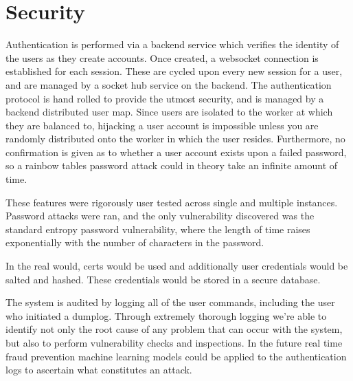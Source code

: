 \chapter{Security}
Authentication is performed via a backend service which verifies the identity of the users as they create accounts.
Once created, a websocket connection is established for each session.
These are cycled upon every new session for a user, and are managed by a socket hub service on the backend.
The authentication protocol is hand rolled to provide the utmost security, and is managed by a backend distributed user map.
Since users are isolated to the worker at which they are balanced to, hijacking a user account is impossible unless you are randomly distributed onto the worker in which the user resides.
Furthermore, no confirmation is given as to whether a user account exists upon a failed password, so a rainbow tables password attack could in theory take an infinite amount of time.

These features were rigorously user tested across single and multiple instances.
Password attacks were ran, and the only vulnerability discovered was the standard entropy password vulnerability, where the length of time raises exponentially with the number of characters in the password.

In the real would, certs would be used and additionally user credentials would be salted and hashed.
These credentials would be stored in a secure database.

The system is audited by logging all of the user commands, including the user who initiated a dumplog.
Through extremely thorough logging we're able to identify not only the root cause of any problem that can occur with the system, but also to perform vulnerability checks and inspections.
In the future real time fraud prevention machine learning models could be applied to the authentication logs to ascertain what constitutes an attack.

